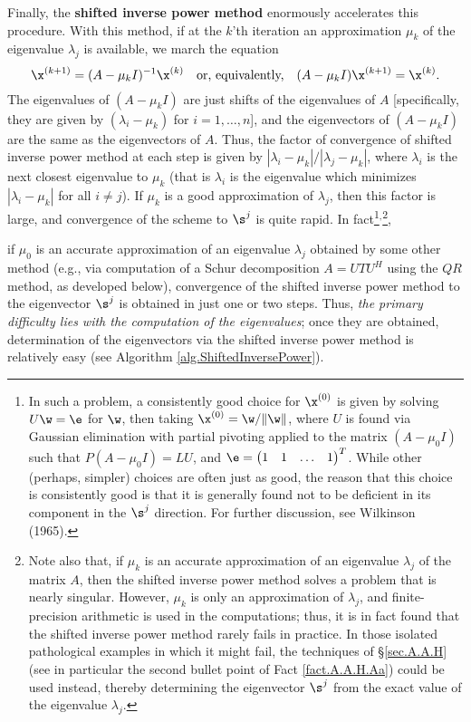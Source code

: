 Finally, the {\bf shifted inverse power method} enormously accelerates this procedure.
With this method, if at the $k$'th iteration an approximation $\mu_k$ of the eigenvalue $\lambda_{j}$ is available, we march the equation
\begin{equation}
\x^{(k+1)}=(A-\mu_k I)^{-1}\x^{(k)} \quad \textrm{or, equivalently,} \quad (A-\mu_k I)\x^{(k+1)}=\x^{(k)}.\label{eq.shiftedinversepowermethod}
\end{equation}
The eigenvalues of $(A-\mu_k I)$ are just shifts of the eigenvalues of $A$ [specifically, they are given by
$(\lambda_i-\mu_k)$ for $i=1,\ldots,n$], and the eigenvectors of $(A-\mu_k I)$ are the same as the eigenvectors of $A$.
Thus, the factor of convergence of shifted inverse power method at each step is given by $|\lambda_{i}-\mu_k|/|\lambda_{j}-\mu_k|$, where $\lambda_{i}$
is the next closest eigenvalue to $\mu_k$ (that is $\lambda_i$ is the eigenvalue which minimizes $|\lambda_{i}-\mu_k|$ for all $i\ne j$).
If $\mu_k$ is a good approximation of $\lambda_{j}$, then this factor is large, and convergence of the scheme to $\s^j$ is quite rapid.
In fact\footnote{In such a problem, a consistently good choice for $\x^{(0)}$ is given by solving $U\w=\e$ for $\w$, then taking $\x^{(0)}=\w/\Vert \w \Vert$, where
$U$ is found via Gaussian elimination with partial pivoting applied to the matrix $(A-\mu_0 I)$
such that $P(A-\mu_0 I)=LU$, and
$\e=\begin{pmatrix} 1 & 1 & \ldots & 1\end{pmatrix}^T$. While other (perhaps, simpler) choices are often just as good,
the reason that this choice is consistently good is that
it is generally found not to be deficient in its component in the $\s^j$ direction.
For further discussion, see Wilkinson (1965).}${}^{,}$\footnote{Note also that, if $\mu_k$ is an accurate approximation of an eigenvalue $\lambda_j$
of the matrix $A$, then the shifted inverse power method solves a problem that is nearly singular.  However,
$\mu_k$ is only an approximation of $\lambda_j$, and finite-precision arithmetic is used in the computations;
thus, it is in fact found that the shifted inverse power method rarely fails in practice.
In those isolated pathological examples in which it might fail, the techniques of \S \ref{sec.A.A.H} (see in particular the second
bullet point of Fact \ref{fact.A.A.H.Aa}) could be used instead, thereby determining the eigenvector $\s^j$ from the exact value of the eigenvalue
$\lambda_j$.},
\beginmylistb
\item if $\mu_0$ is an accurate approximation of an eigenvalue $\lambda_{j}$ obtained by some other method (e.g., via computation of a Schur
decomposition $A=UTU^H$ using the $QR$ method, as developed below), convergence of the shifted inverse power method
to the eigenvector $\s^j$ is obtained in just one or two steps.
\endmylist
Thus, {\it the primary difficulty lies with the computation of the eigenvalues}; once they are obtained, determination of the eigenvectors
via the shifted inverse power method is relatively easy (see Algorithm \ref{alg.ShiftedInversePower}).


